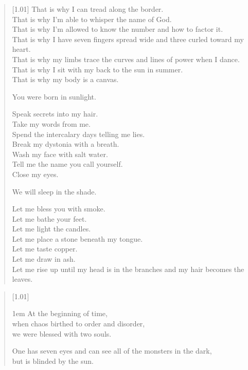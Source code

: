 \begin{paracol}{2}
\begin{verse}[1.01\textwidth]
    That is why I can tread along the border.\\
    That is why I'm able to whisper the name of God.\\
    That is why I'm allowed to know the number and how to factor it.\\
    That is why I have seven fingers spread wide and three curled toward my heart.\\
    That is why my limbs trace the curves and lines of power when I dance.\\
    That is why I sit with my back to the sun in summer.\\
    That is why my body is a canvas.\vspace{-7pt}

    You were born in sunlight.\vspace{-7pt}

    Speak secrets into my hair.\\
    Take my words from me.\\
    Spend the intercalary days telling me lies.\\
    Break my dystonia with a breath.\\
    Wash my face with salt water.\\
    Tell me the name you call yourself.\\
    Close my eyes.\vspace{-7pt}

    We will sleep in the shade.\vspace{-7pt}

    Let me bless you with smoke.\\
    Let me bathe your feet.\\
    Let me light the candles.\\
    Let me place a stone beneath my tongue.\\
    Let me taste copper.\\
    Let me draw in ash.\\
    Let me rise up until my head is in the branches and my hair becomes the leaves.
\end{verse}
\newpage

\null
\vfill
\begin{verse}[1.01\textwidth]
    {\vgap1em
    At the beginning of time,\\
    \vin \vin when chaos birthed to order and disorder,\\
    we were blessed with two souls.

    One has seven eyes and can see all of the monsters in the dark,\\
    \vin \vin but is blinded by the sun.

}
\end{verse}
\end{paracol}
